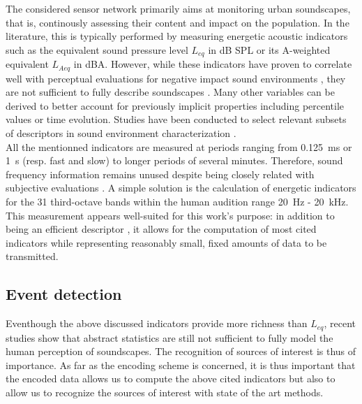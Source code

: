 \documentclass[final,3p,times,twocolumn]{elsarticle}
\begin{document}
The considered sensor network primarily aims at monitoring urban soundscapes, that is, continously assessing their content and impact on the population. In the literature, this is typically performed by measuring energetic acoustic indicators such as the equivalent sound pressure level $L_{eq}$ in dB SPL or its A-weighted equivalent $L_{Aeq}$ in dBA. However, while these indicators have proven to correlate well with perceptual evaluations for negative impact sound environments \cite{gozalo2015}, they are not sufficient to fully describe soundscapes \cite{rychtarikova2013}. Many other variables can be derived to better account for previously implicit properties \cite{can2016} including percentile values or time evolution. Studies have been conducted to select relevant subsets of descriptors in sound environment characterization \cite{can2015, brocolini2013, nilsson2007}.\\

All the mentionned indicators are measured at periods ranging from 0.125~ms or 1~s (resp. fast and slow) to longer periods of several minutes. Therefore, sound frequency information remains unused despite being closely related with subjective evaluations \cite{ishiyama2000}. A simple solution is the calculation of energetic indicators for the 31 third-octave bands within the human audition range 20~Hz - 20~kHz.\\

This measurement appears well-suited for this work's purpose: in addition to being an efficient descriptor \cite{torija2013}, it allows for the computation of most cited indicators while representing reasonably small, fixed amounts of data to be transmitted.

\subsection{Event detection}

Eventhough the above discussed indicators provide more richness than $L_{eq}$, recent studies show that abstract statistics are still not sufficient to fully model the human perception of soundscapes. The recognition of sources of interest is thus of importance. As far as the encoding scheme is concerned, it is thus important that the encoded data allows us to compute the above cited indicators but also to allow us to recognize the sources of interest with state of the art methods.
\end{document}
